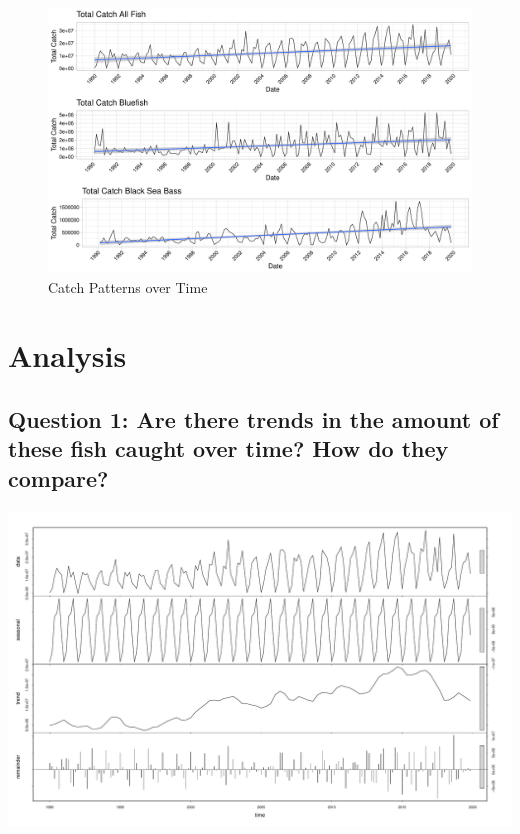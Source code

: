\documentclass[
  12pt,
]{article}
\begin{document}
\begin{figure}
\centering
\includegraphics{Report_FishTrends_files/figure-latex/ggplot-1.pdf}
\caption{Catch Patterns over Time}
\end{figure}

\newpage

\hypertarget{analysis}{%
\section{Analysis}\label{analysis}}

\hypertarget{question-1-are-there-trends-in-the-amount-of-these-fish-caught-over-time-how-do-they-compare}{%
\subsection{Question 1: Are there trends in the amount of these fish
caught over time? How do they
compare?}\label{question-1-are-there-trends-in-the-amount-of-these-fish-caught-over-time-how-do-they-compare}}

\includegraphics{Report_FishTrends_files/figure-latex/unnamed-chunk-1-1.pdf}
\end{document}
